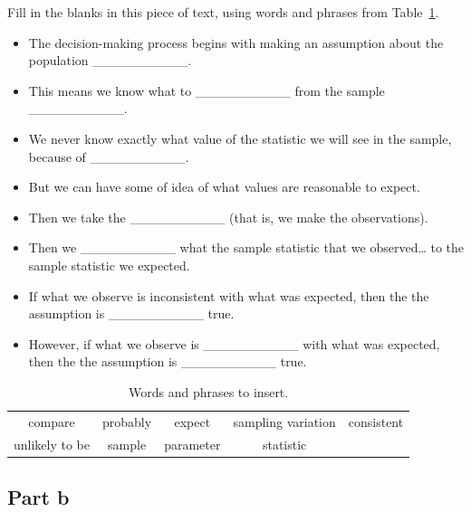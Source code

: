 \documentclass[
  11pt,
  a4paper,
  krantz2]{krantz}
\makeatletter
\providecommand{\tightlist}{%
  \setlength{\itemsep}{0pt}\setlength{\parskip}{0pt}}
\renewenvironment{quote}%
{\begin{kframe}}
{\end{kframe}}
\newenvironment{kframe}{%
\medskip{}
\setlength{\fboxsep}{.8em}
 \def\at@end@of@kframe{}%
 \ifinner\ifhmode%
  \def\at@end@of@kframe{\end{minipage}}%
  \begin{minipage}{\columnwidth}%
 \fi\fi%
 \def\FrameCommand##1{\hskip\@totalleftmargin \hskip-\fboxsep
 \colorbox{shadecolor}{##1}\hskip-\fboxsep
     \hskip-\linewidth \hskip-\@totalleftmargin \hskip\columnwidth}%
 \MakeFramed {\advance\hsize-\width
   \@totalleftmargin\z@ \linewidth\hsize
   \@setminipage}}%
 {\par\unskip\endMakeFramed%
 \at@end@of@kframe}
\renewenvironment{quote}
               {\list{}{\vspace{-0.5em}\begin{kframe}\small%
                        \rightmargin   \leftmargin
                        \parsep        \z@ \@plus\p@}%
                \item\relax}
               {\end{kframe}\endlist}
\makeatother
\begin{document}
Fill in the blanks in this piece of text, using words and phrases from Table~\ref{tab:Words1Table}.

\begin{quote}
\begin{itemize}
\tightlist
\item
  The decision-making process begins with making an assumption about the population \_\_\_\_\_\_\_\_\_\_.\\
\item
  This means we know what to \_\_\_\_\_\_\_\_\_\_ from the sample \_\_\_\_\_\_\_\_\_\_.\\
\item
  We never know exactly what value of the statistic we will see in the sample, because of \_\_\_\_\_\_\_\_\_\_.\\
\item
  But we can have some of idea of what values are reasonable to expect.\\
\item
  Then we take the \_\_\_\_\_\_\_\_\_\_ (that is, we make the observations).\\
\item
  Then we \_\_\_\_\_\_\_\_\_\_ what the sample statistic that we observed\ldots{} to the sample statistic we expected.\\
\item
  If what we observe is inconsistent with what was expected, then the the assumption is \_\_\_\_\_\_\_\_\_\_ true.\\
\item
  However, if what we observe is \_\_\_\_\_\_\_\_\_\_ with what was expected, then the the assumption is \_\_\_\_\_\_\_\_\_\_ true.
\end{itemize}
\end{quote}

\begin{table}
\centering
\caption{\label{tab:Words1Table}Words and phrases to insert.}
\centering
\fontsize{10}{12}\selectfont
\begin{tabular}[t]{ccccc}
\toprule
compare & probably & expect & sampling variation & consistent\\
unlikely to be & sample & parameter & statistic & \\
\bottomrule
\end{tabular}
\end{table}

\subsection{Part b}\label{part-b}
\end{document}
